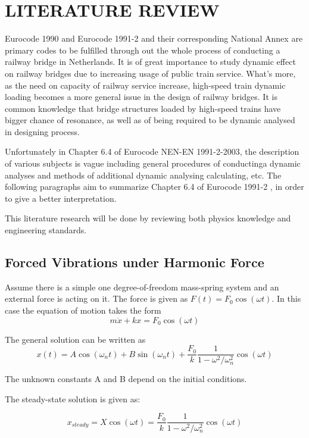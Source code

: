
\chapter{LITERATURE REVIEW} 
Eurocode 1990 and Eurocode 1991-2 and their corresponding National Annex are primary codes to be fulfilled through out the whole process of conducting a railway bridge in Netherlands. It is of great importance to study dynamic effect on railway bridges due to increasing usage of public train service. What's more, as the need on capacity of railway service increase, high-speed train dynamic loading becomes a more general issue in the design of railway bridges. It is common knowledge that bridge structures loaded by high-speed trains have bigger chance of resonance, as well as of being required to be dynamic analysed in designing process. 

Unfortunately in Chapter 6.4 of Eurocode NEN-EN 1991-2-2003, the description of various subjects is vague including general procedures of conductinga dynamic analyses and methods of additional dynamic analysing calculating, etc. The following paragraphs aim to summarize Chapter 6.4 of Eurocode 1991-2 \cite{EC12}, in order to give a better interpretation. 

This literature research will be done by reviewing both physics knowledge and engineering standards.

\section{Forced Vibrations under Harmonic Force}
Assume there is a simple one degree-of-freedom mass-spring system and an external force is acting on it. The force is given as $F(t)= F_0 \cos(\omega t)$. In this case the equation of motion takes the form
\begin{equation}
	m\ddot{x} + kx = F_0 \cos(\omega t)
\end{equation}

The general solution can be written as
\begin{equation}
	x(t) = A\cos(\omega_n t)+B\sin(\omega_n t) +\frac{F_0}{k}\frac{1}{1-\omega^2/\omega_n^2}\cos(\omega t)
\end{equation}

The unknown constants A and B depend on the initial conditions.

The steady-state solution is given as:

\begin{equation}
	x_{steady}= X \cos(\omega t) = \frac{F_0}{k}\frac{1}{1-\omega^2/\omega_n^2}\cos(\omega t)
\end{equation}

